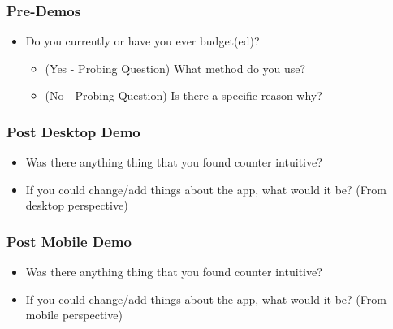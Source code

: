 \documentclass{chi2011}
\begin{document}
	\subsubsection{Pre-Demos}
	\begin{itemize}[noitemsep]
		\item Do you currently or have you ever budget(ed)?
		\begin{itemize}[noitemsep]
			\item (Yes - Probing Question) What method do you use?
			\item (No - Probing Question) Is there a specific reason why?
		\end{itemize}
	\end{itemize}
	
	\subsubsection{Post Desktop Demo}
	\begin{itemize}[noitemsep]
		\item Was there anything thing that you found counter intuitive?
		\item If you could change/add things about the app, what would it be? (From desktop perspective)
	\end{itemize}

	\subsubsection{Post Mobile Demo}
	\begin{itemize}[noitemsep]
		\item Was there anything thing that you found counter intuitive?
		\item If you could change/add things about the app, what would it be? (From mobile perspective)
	\end{itemize}
\end{document}
